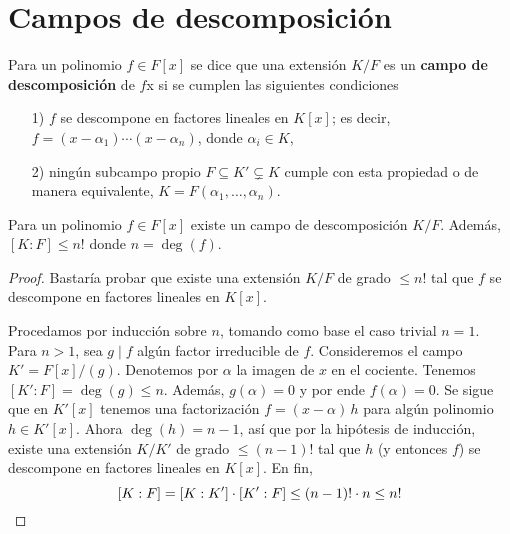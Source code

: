
\section{Campos de descomposición}

\begin{definicion}
  Para un polinomio $f \in F[x]$ se dice que una extensión $K/F$ es un
  \textbf{campo de descomposición} de $f$x si se cumplen las siguientes condiciones

  \begin{enumerate}
  \item[1)] $f$ se descompone en factores lineales en $K[x]$; es decir,
    $f = (x - \alpha_1)\cdots (x - \alpha_n)$, donde $\alpha_i \in K$,

  \item[2)] ningún subcampo propio $F \subseteq K' \subsetneq K$ cumple con
    esta propiedad o de manera equivalente,
    $K = F (\alpha_1,\ldots,\alpha_n)$.
  \end{enumerate}
\end{definicion}

\begin{proposicion}
  Para un polinomio $f \in F [x]$ existe un campo de descomposición
  $K/F$. Además, $[K : F] \le n!$ donde $n = \deg (f)$.

  \begin{proof}
    Bastaría probar que existe una extensión $K/F$ de grado $\le n!$ tal que $f$
    se descompone en factores lineales en $K [x]$.

    Procedamos por inducción sobre $n$, tomando como base el caso trivial
    $n = 1$. Para $n > 1$, sea $g \mid f$ algún factor irreducible de
    $f$. Consideremos el campo $K' = F [x] / (g)$. Denotemos por $\alpha$ la
    imagen de $x$ en el cociente. Tenemos $[K' : F] = \deg (g) \le n$. Además,
    $g (\alpha) = 0$ y por ende $f (\alpha) = 0$. Se sigue que en $K' [x]$
    tenemos una factorización $f = (x - \alpha)\,h$ para algún polinomio
    $h\in K' [x]$. Ahora $\deg (h) = n-1$, así que por la hipótesis de
    inducción, existe una extensión $K / K'$ de grado $\le (n-1)!$ tal que $h$
    (y entonces $f$) se descompone en factores lineales en $K [x]$. En fin,
    \[ [K : F] = [K : K']\cdot [K' : F] \le (n-1)!\cdot n \le n! \qedhere \]
  \end{proof}
\end{proposicion}


